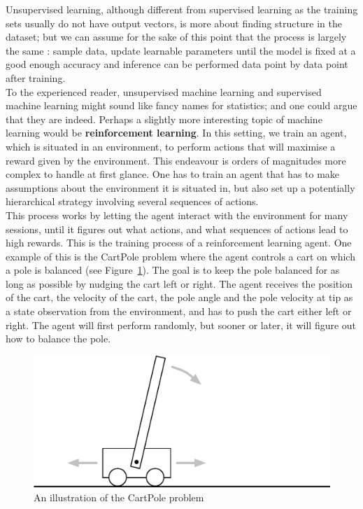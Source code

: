 Unsupervised learning, although different from supervised learning as the
training sets usually do not have output vectors, is more about finding
structure in the dataset; but we can assume for the sake of this point that
the process is largely the same : sample data, update learnable parameters
until the model is fixed at a good enough accuracy and inference can be
performed data point by data point after training.\\

To the experienced reader, unsupervised machine learning and supervised machine
learning might sound like fancy names for statistics; and one could argue that
they are indeed. Perhaps a slightly more interesting topic of machine learning
would be \textbf{reinforcement learning}. In this setting, we train an agent, 
which is situated in an environment, to perform actions that will maximise
a reward given by the environment. This endeavour is orders of magnitudes more
complex to handle at first glance. One has to train an agent that has to make
assumptions about the environment it is situated in, but also set up a
potentially hierarchical strategy involving several sequences of actions.\\

This process works by letting the agent interact with the environment for many
sessions, until it figures out what actions, and what sequences of actions lead
to high rewards. This is the training process of a reinforcement learning agent.
One example of this is the CartPole problem \cite{barto-cartpole} where the
agent controls a cart on which a pole is balanced (see
Figure~\ref{fig:cartpole_illustration}). The goal is to keep the
pole balanced for as long as possible by nudging the cart left or right. The
agent receives the position of the cart, the velocity of the cart, the pole
angle and the pole velocity at tip as a state observation from the environment,
and has to push the cart either left or right. The agent will first perform
randomly, but sooner or later, it will figure out how to balance the pole.\\

\begin{figure}
	\centering
	\includegraphics[width=0.8\linewidth]{fig/cartpole.eps}
	\caption{An illustration of the CartPole problem}
	\label{fig:cartpole_illustration}
\end{figure}

